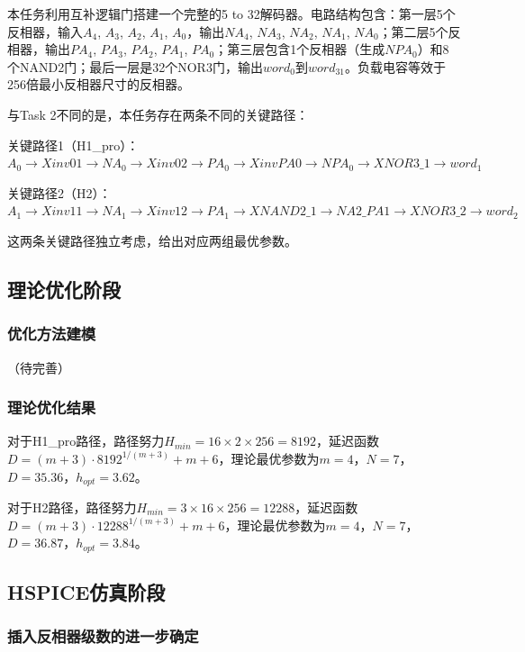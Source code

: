 \documentclass[UTF8,12pt,a4paper]{ctexart}
\begin{document}
本任务利用互补逻辑门搭建一个完整的5 to 32解码器。电路结构包含：第一层5个反相器，输入$A_4$, $A_3$, $A_2$, $A_1$, $A_0$，输出$NA_4$, $NA_3$, $NA_2$, $NA_1$, $NA_0$；第二层5个反相器，输出$PA_4$, $PA_3$, $PA_2$, $PA_1$, $PA_0$；第三层包含1个反相器（生成$NPA_0$）和8个NAND2门；最后一层是32个NOR3门，输出$word_0$到$word_{31}$。负载电容等效于256倍最小反相器尺寸的反相器。

与Task 2不同的是，本任务存在两条不同的关键路径：

关键路径1（H1\_pro）：$A_0 \rightarrow Xinv01 \rightarrow NA_0 \rightarrow Xinv02 \rightarrow PA_0 \rightarrow XinvPA0 \rightarrow NPA_0 \rightarrow XNOR3\_1 \rightarrow word_1$

关键路径2（H2）：$A_1 \rightarrow Xinv11 \rightarrow NA_1 \rightarrow Xinv12 \rightarrow PA_1 \rightarrow XNAND2\_1 \rightarrow NA2\_PA1 \rightarrow XNOR3\_2 \rightarrow word_2$

这两条关键路径独立考虑，给出对应两组最优参数。

\subsection{理论优化阶段}

\subsubsection{优化方法建模}

（待完善）

\subsubsection{理论优化结果}

对于H1\_pro路径，路径努力$H_{min} = 16 \times 2 \times 256 = 8192$，延迟函数$D = (m+3) \cdot 8192^{1/(m+3)} + m + 6$，理论最优参数为$m = 4$，$N = 7$，$D = 35.36$，$h_{opt} = 3.62$。

对于H2路径，路径努力$H_{min} = 3 \times 16 \times 256 = 12288$，延迟函数$D = (m+3) \cdot 12288^{1/(m+3)} + m + 6$，理论最优参数为$m = 4$，$N = 7$，$D = 36.87$，$h_{opt} = 3.84$。

\subsection{HSPICE仿真阶段}

\subsubsection{插入反相器级数的进一步确定}
\end{document}
